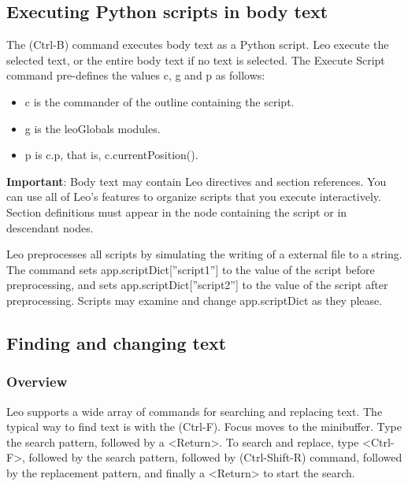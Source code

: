 \documentclass[a4paper,10pt,english]{sphinxmanual}
\begin{document}
\subsection{Executing Python scripts in body text}
\label{commands:executing-python-scripts-in-body-text}
The  (Ctrl-B) command executes body text as a Python
script. Leo execute the selected text, or the entire body text if no text
is selected. The Execute Script command pre-defines the values c, g and p
as follows:
\begin{itemize}
\item {} 
c is the commander of the outline containing the script.

\item {} 
g is the leoGlobals modules.

\item {} 
p is c.p, that is, c.currentPosition().

\end{itemize}

\textbf{Important}: Body text may contain Leo directives and section references.
You can use all of Leo's features to organize scripts that you execute
interactively. Section definitions must appear in the node containing the
script or in descendant nodes.

Leo preprocesses all scripts by simulating the writing of a external file
to a string. The  command sets app.scriptDict{[}''script1''{]}
to the value of the script before preprocessing, and sets
app.scriptDict{[}''script2''{]} to the value of the script after preprocessing.
Scripts may examine and change app.scriptDict as they please.


\subsection{Finding and changing text}
\label{commands:finding-and-changing-text}

\subsubsection{Overview}
\label{commands:overview}
Leo supports a wide array of commands for searching and replacing
text. The typical way to find text is with the
 (Ctrl-F). Focus moves to the
minibuffer. Type the search pattern, followed by a \textless{}Return\textgreater{}. To search
and replace, type \textless{}Ctrl-F\textgreater{}, followed by the search pattern, followed
by  (Ctrl-Shift-R) command, followed by the
replacement pattern, and finally a \textless{}Return\textgreater{} to start the search.
\end{document}
